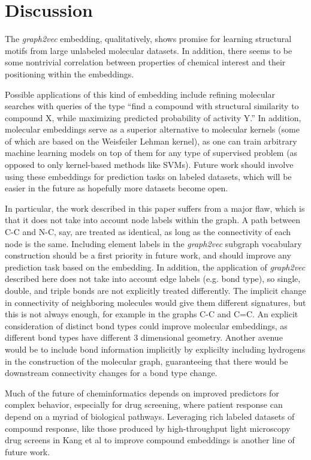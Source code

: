 \section{Discussion}

The \textit{graph2vec} embedding, qualitatively, shows promise for learning structural motifs from large unlabeled molecular datasets. In addition, there seems to be some nontrivial correlation between properties of chemical interest and their positioning within the embeddings.

Possible applications of this kind of embedding include refining molecular searches with queries of the type ``find a compound with structural similarity to compound X, while maximizing predicted probability of activity Y.'' In addition, molecular embeddings serve as a superior alternative to molecular kernels (some of which are based on the Weisfeiler Lehman kernel), as one can train arbitrary machine learning models on top of them for any type of supervised problem (as opposed to only kernel-based methods like SVMs). Future work should involve using these embeddings for prediction tasks on labeled datasets, which will be easier in the future as hopefully more datasets become open.

In particular, the work described in this paper suffers from a major flaw, which is that it does not take into account node labels within the graph. A path between C-C and N-C, say, are treated as identical, as long as the connectivity of each node is the same. Including element labels in the \textit{graph2vec} subgraph vocabulary construction should be a first priority in future work, and should improve any prediction task based on the embedding. In addition, the application of \textit{graph2vec} described here does not take into account edge labels (e.g. bond type), so single, double, and triple bonds are not explicitly treated differently. The implicit change in connectivity of neighboring molecules would give them different signatures, but this is not always enough, for example in the graphs C-C and C=C. An explicit consideration of distinct bond types could improve molecular embeddings, as different bond types have different 3 dimensional geometry. Another avenue would be to include bond information implicitly by explicilty including hydrogens in the construction of the molecular graph, guaranteeing that there would be downstream connectivity changes for a bond type change.

Much of the future of cheminformatics depends on improved predictors for complex behavior, especially for drug screening, where patient response can depend on a myriad of biological pathways. Leveraging rich labeled datasets of compound response, like those produced by high-throughput light microscopy drug screens in Kang et al \cite{Kang2016} to improve compound embeddings is another line of future work.

